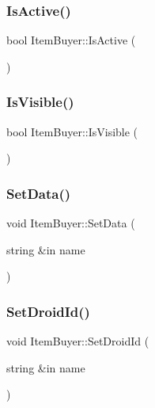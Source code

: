 \hypertarget{class_item_buyer_a580f7035e12b6a6f109a0aa995115174}{}\label{class_item_buyer_a580f7035e12b6a6f109a0aa995115174} 
\subsubsection{\texorpdfstring{Is\+Active()}{IsActive()}}
{\footnotesize\ttfamily bool Item\+Buyer\+::\+Is\+Active (\begin{DoxyParamCaption}{ }\end{DoxyParamCaption})}

\hypertarget{class_item_buyer_a0ba1c6f30b104ea4d5ebaf6d0cf5756e}{}\label{class_item_buyer_a0ba1c6f30b104ea4d5ebaf6d0cf5756e} 
\subsubsection{\texorpdfstring{Is\+Visible()}{IsVisible()}}
{\footnotesize\ttfamily bool Item\+Buyer\+::\+Is\+Visible (\begin{DoxyParamCaption}{ }\end{DoxyParamCaption})}

\hypertarget{class_item_buyer_a8ba56bb2a91a492712bd278b14e8001b}{}\label{class_item_buyer_a8ba56bb2a91a492712bd278b14e8001b} 
\subsubsection{\texorpdfstring{Set\+Data()}{SetData()}}
{\footnotesize\ttfamily void Item\+Buyer\+::\+Set\+Data (\begin{DoxyParamCaption}\item[{string \&in}]{name }\end{DoxyParamCaption})}

\hypertarget{class_item_buyer_a5ad47ea4f8f30521cfea78a2c8ddab0e}{}\label{class_item_buyer_a5ad47ea4f8f30521cfea78a2c8ddab0e} 
\subsubsection{\texorpdfstring{Set\+Droid\+Id()}{SetDroidId()}}
{\footnotesize\ttfamily void Item\+Buyer\+::\+Set\+Droid\+Id (\begin{DoxyParamCaption}\item[{string \&in}]{name }\end{DoxyParamCaption})}

